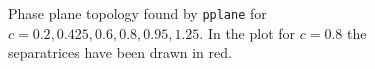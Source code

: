 \begin{figure}
\centering






\caption{Phase plane topology found by \texttt{pplane} for $c = 0.2, 0.425, 0.6, 0.8, 0.95, 1.25$. In the plot for $c = 0.8$ the separatrices have been drawn in red.}
\label{fig:NumTop}
\end{figure}


